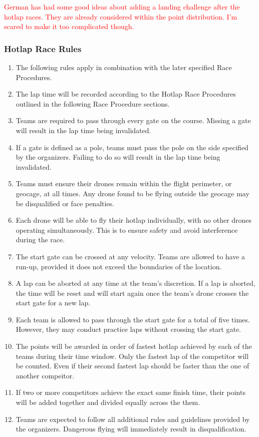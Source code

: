     \textcolor{red}{German has had some good ideas about adding a landing challenge after the hotlap races. They are already considered within the point distribution. I'm scared to make it too complicated though.}

    \subsubsection{Hotlap Race Rules}
    \begin{enumerate}
      \item The following rules apply in combination with the later specified Race Procedures.
      \item The lap time will be recorded according to the Hotlap Race Procedures outlined in the following Race Procedure sections.
      \item Teams are required to pass through every gate on the course. Missing a gate will result in the lap time being invalidated.
      \item If a gate is defined as a pole, teams must pass the pole on the side specified by the organizers. Failing to do so will result in the lap time being invalidated.
      \item Teams must ensure their drones remain within the flight perimeter, or geocage, at all times. Any drone found to be flying outside the geocage may be disqualified or face penalties.
      \item Each drone will be able to fly their hotlap individually, with no other drones operating simultaneously. This is to ensure safety and avoid interference during the race.
      \item The start gate can be crossed at any velocity. Teams are allowed to have a run-up, provided it does not exceed the boundaries of the location.
      \item A lap can be aborted at any time at the team's discretion. If a lap is aborted, the time will be reset and will start again once the team's drone crosses the start gate for a new lap.
      \item Each team is allowed to pass through the start gate for a total of five times. However, they may conduct practice laps without crossing the start gate.  
      \item The points will be awarded in order of fastest hotlap achieved by each of the teams during their time window. Only the fastest lap of the competitor will be counted. Even if their second fastest lap should be faster than the one of another compeitor.
      \item If two or more competitors achieve the exact same finish time, their points will be added together and divided equally across the them.  
      \item Teams are expected to follow all additional rules and guidelines provided by the organizers. Dangerous flying will immediately result in disqualification. 
    \end{enumerate}


